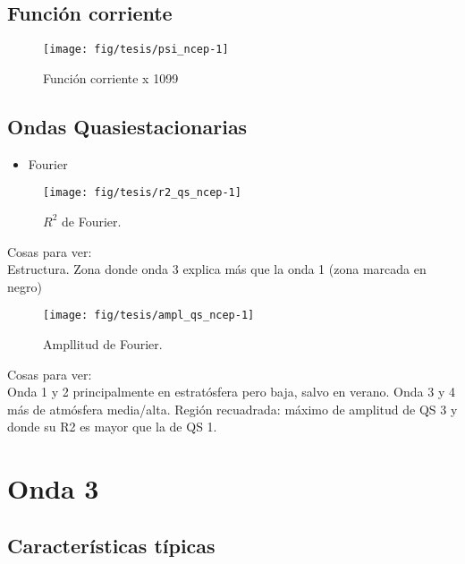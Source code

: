 \documentclass[spanish,a4paper]{book}
\providecommand{\tightlist}{%
  \setlength{\itemsep}{0pt}\setlength{\parskip}{0pt}}
\begin{document}
\section{Función corriente}\label{funcion-corriente}

\begin{figure*}
\texttt{[image: fig/tesis/psi\_ncep-1]} \caption{Función corriente x 1099}\label{fig:psi_ncep}
\end{figure*}

\section{Ondas Quasiestacionarias}\label{ondas-quasiestacionarias}

\begin{itemize}
\tightlist
\item
  Fourier
\end{itemize}

\begin{figure}

{\centering \texttt{[image: fig/tesis/r2\_qs\_ncep-1]} 

}

\caption{$R^2$ de Fourier.}\label{fig:r2_qs_ncep}
\end{figure}

Cosas para ver:\\
Estructura. Zona donde onda 3 explica más que la onda 1 (zona marcada en
negro)

\begin{figure}

{\centering \texttt{[image: fig/tesis/ampl\_qs\_ncep-1]} 

}

\caption{Ampllitud de Fourier.}\label{fig:ampl_qs_ncep}
\end{figure}

Cosas para ver:\\
Onda 1 y 2 principalmente en estratósfera pero baja, salvo en verano.
Onda 3 y 4 más de atmósfera media/alta. Región recuadrada: máximo de
amplitud de QS 3 y donde su R2 es mayor que la de QS 1.

\chapter{Onda 3}\label{onda-3}

\section{Características típicas}\label{caracteristicas-tipicas}
\end{document}
